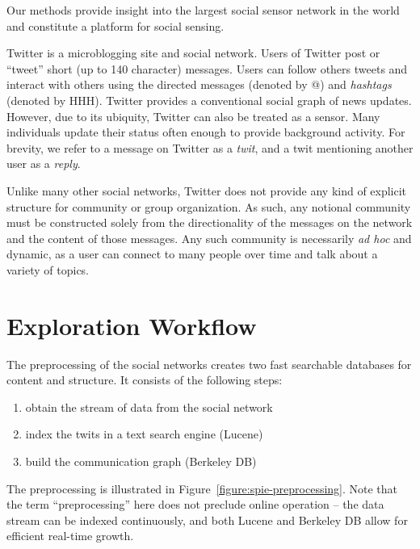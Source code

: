 \documentclass[10pt,oneside]{memoir}
\begin{document}
\begin{Spacing}{2}
Our methods provide insight into the largest social sensor network in the world and constitute a platform for social sensing.


Twitter is a microblogging site and social network. Users of
Twitter post or ``tweet'' short (up to 140 character) messages. Users
can follow others tweets and interact with others using the
directed messages (denoted by @) and {\itshape hashtags} (denoted by HHH).
Twitter provides a conventional social graph of news updates.
However, due to its ubiquity, Twitter can also be treated as a
sensor. Many individuals update their status often enough to
provide background activity. For brevity, we refer to a message on
Twitter as a {\itshape twit}, and a twit mentioning another user as a
{\itshape reply}.


Unlike many other social networks, Twitter does not provide any
kind of explicit structure for community or group organization. As
such, any notional community must be constructed solely from the
directionality of the messages on the network and the content of
those messages. Any such community is necessarily {\itshape ad hoc} and
dynamic, as a user can connect to many people over time and talk
about a variety of topics.


\pagebreak \section{Exploration Workflow}
\label{explorationworkflow}

The preprocessing of the social networks creates two fast
searchable databases for content and structure. It consists of the
following steps:


\begin{enumerate}


\item obtain the stream of data from the social network




\item index the twits in a text search engine (Lucene)




\item build the communication graph (Berkeley DB)



\end{enumerate}

The preprocessing is illustrated in Figure~\ref{figure:spie-preprocessing}.
Note that the term ``preprocessing'' here does not preclude online
operation -- the data stream can be indexed continuously, and both
Lucene and Berkeley DB allow for efficient real-time growth.




\end{Spacing}
\end{document}
